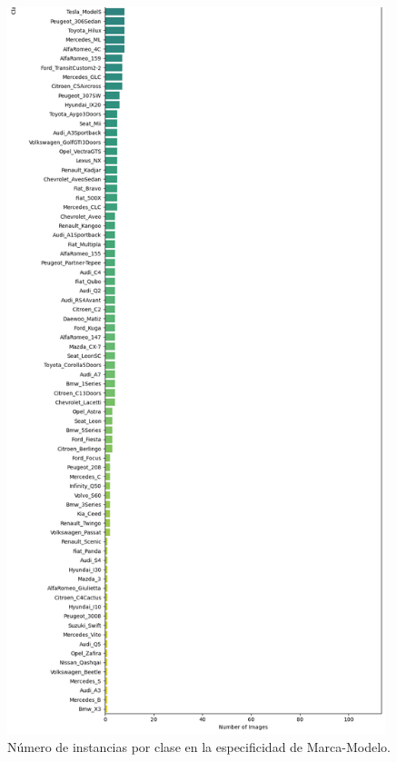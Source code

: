 \begin{figure}
	\centering
	\includegraphics[width=110mm]{img/imbalance-marca-modelo-2.png}
	\caption{Número de instancias por clase en la especificidad de Marca-Modelo.}
	\label{fig:imb-mm}
\end{figure}

